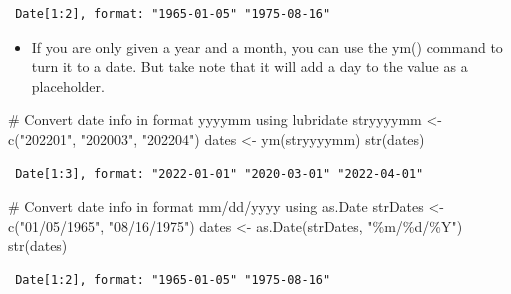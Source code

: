 \documentclass[
  letterpaper,
  DIV=11,
  numbers=noendperiod]{scrreprt}
\newenvironment{Shaded}{\begin{snugshade}}{\end{snugshade}}
\newcommand{\CommentTok}[1]{\textcolor[rgb]{0.37,0.37,0.37}{#1}}
\newcommand{\FunctionTok}[1]{\textcolor[rgb]{0.28,0.35,0.67}{#1}}
\newcommand{\NormalTok}[1]{\textcolor[rgb]{0.00,0.23,0.31}{#1}}
\newcommand{\OtherTok}[1]{\textcolor[rgb]{0.00,0.23,0.31}{#1}}
\newcommand{\StringTok}[1]{\textcolor[rgb]{0.13,0.47,0.30}{#1}}
\providecommand{\tightlist}{%
  \setlength{\itemsep}{0pt}\setlength{\parskip}{0pt}}\usepackage{longtable,booktabs,array}
\begin{document}
\begin{verbatim}
 Date[1:2], format: "1965-01-05" "1975-08-16"
\end{verbatim}

\begin{itemize}
\tightlist
\item
  If you are only given a year and a month, you can use the ym() command
  to turn it to a date. But take note that it will add a day to the
  value as a placeholder.
\end{itemize}

\begin{Shaded}
\begin{Highlighting}[]
\CommentTok{\# Convert date info in format \textquotesingle{}yyyymm\textquotesingle{} using lubridate}
\NormalTok{stryyyymm }\OtherTok{\textless{}{-}} \FunctionTok{c}\NormalTok{(}\StringTok{"202201"}\NormalTok{, }\StringTok{"202003"}\NormalTok{, }\StringTok{"202204"}\NormalTok{)}
\NormalTok{dates }\OtherTok{\textless{}{-}} \FunctionTok{ym}\NormalTok{(stryyyymm)}
\FunctionTok{str}\NormalTok{(dates)}
\end{Highlighting}
\end{Shaded}

\begin{verbatim}
 Date[1:3], format: "2022-01-01" "2020-03-01" "2022-04-01"
\end{verbatim}

\begin{Shaded}
\begin{Highlighting}[]
\CommentTok{\# Convert date info in format \textquotesingle{}mm/dd/yyyy\textquotesingle{} using as.Date}
\NormalTok{strDates }\OtherTok{\textless{}{-}} \FunctionTok{c}\NormalTok{(}\StringTok{"01/05/1965"}\NormalTok{, }\StringTok{"08/16/1975"}\NormalTok{)}
\NormalTok{dates }\OtherTok{\textless{}{-}} \FunctionTok{as.Date}\NormalTok{(strDates, }\StringTok{"\%m/\%d/\%Y"}\NormalTok{)}
\FunctionTok{str}\NormalTok{(dates)}
\end{Highlighting}
\end{Shaded}

\begin{verbatim}
 Date[1:2], format: "1965-01-05" "1975-08-16"
\end{verbatim}
\end{document}
